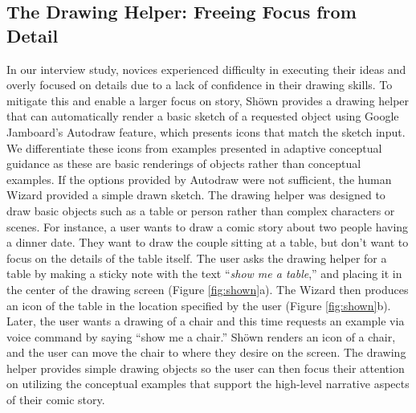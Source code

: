 \subsection{The Drawing Helper: Freeing Focus from Detail}
In our interview study, novices experienced difficulty in executing their ideas and overly focused on details due to a lack of confidence in their drawing skills. To mitigate this and enable a larger focus on story, Sh{\"o}wn provides a drawing helper that can automatically render a basic sketch of a requested object using Google Jamboard's Autodraw feature, which presents icons that match the sketch input. We differentiate these icons from examples presented in adaptive conceptual guidance as these are basic renderings of objects rather than conceptual examples. If the options provided by Autodraw were not sufficient, the human Wizard provided a simple drawn sketch. The drawing helper was designed to draw basic objects such as a table or person rather than complex characters or scenes. For instance, a user wants to draw a comic story about two people having a dinner date. They want to draw the couple sitting at a table, but don't want to focus on the details of the table itself. The user asks the drawing helper for a table by making a sticky note with the text ``\textit{show me a table},'' and placing it in the center of the drawing screen (Figure \ref{fig:shown}a). The Wizard then produces an icon of the table in the location specified by the user (Figure \ref{fig:shown}b). Later, the user wants a drawing of a chair and this time requests an example via voice command by saying ``show me a chair.'' Sh{\"o}wn renders an icon of a chair, and the user can move the chair to where they desire on the screen. The drawing helper provides simple drawing objects so the user can then focus their attention on utilizing the conceptual examples that support the high-level narrative aspects of their comic story.